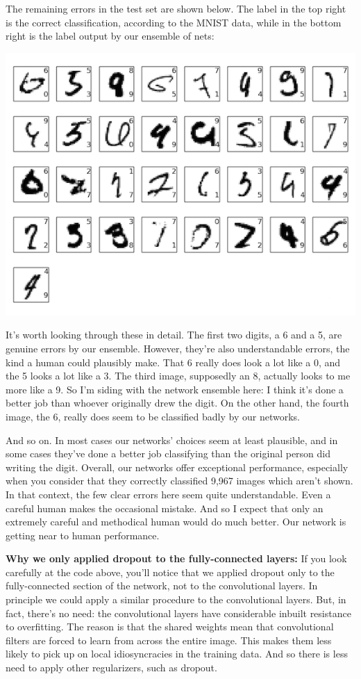 \documentclass[a4paper,twoside,10pt]{book}
\begin{document}
The remaining errors in the test set are shown below. The label in the top right is the correct classification, according to the MNIST data, while in the bottom right is the label output by our ensemble of nets:
\begin{center}
	\includegraphics[width=0.7\linewidth]{figures/ch6/ensemble_errors}
\end{center}
It's worth looking through these in detail. The first two digits, a 6 and a 5, are genuine errors by our ensemble. However, they're also understandable errors, the kind a human could plausibly make. That 6 really does look a lot like a 0, and the 5 looks a lot like a 3. The third image, supposedly an 8, actually looks to me more like a 9. So I'm siding with the network ensemble here: I think it's done a better job than whoever originally drew the digit. On the other hand, the fourth image, the 6, really does seem to be classified badly by our networks.

And so on. In most cases our networks' choices seem at least plausible, and in some cases they've done a better job classifying than the original person did writing the digit. Overall, our networks offer exceptional performance, especially when you consider that they correctly classified 9,967 images which aren't shown. In that context, the few clear errors here seem quite understandable. Even a careful human makes the occasional mistake. And so I expect that only an extremely careful and methodical human would do much better. Our network is getting near to human performance.

\textbf{Why we only applied dropout to the fully-connected layers:} If you look carefully at the code above, you'll notice that we applied dropout only to the fully-connected section of the network, not to the convolutional layers. In principle we could apply a similar procedure to the convolutional layers. But, in fact, there's no need: the convolutional layers have considerable inbuilt resistance to overfitting. The reason is that the shared weights mean that convolutional filters are forced to learn from across the entire image. This makes them less likely to pick up on local idiosyncracies in the training data. And so there is less need to apply other regularizers, such as dropout.
\end{document}
